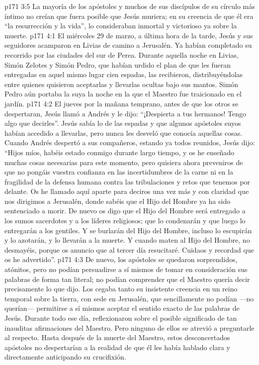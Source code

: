 \vs p171 3:5 La mayoría de los apóstoles y muchos de sus discípulos de su círculo más íntimo no creían que fuera posible que Jesús muriera; en su creencia de que él era “la resurrección y la vida”, lo consideraban inmortal y victorioso ya sobre la muerte.
\vs p171 4:1 El miércoles 29 de marzo, a última hora de la tarde, Jesús y sus seguidores acamparon en Livias de camino a Jerusalén. Ya habían completado su recorrido por las ciudades del sur de Perea. Durante aquella noche en Livias, Simón Zelotes y Simón Pedro, que habían urdido el plan de que les fueran entregadas en aquel mismo lugar cien espadas, las recibieron, distribuyéndolas entre quienes quisieron aceptarlas y llevarlas ocultas bajo sus mantos. Simón Pedro aún portaba la suya la noche en la que el Maestro fue traicionado en el jardín.
\vs p171 4:2 El jueves por la mañana temprano, antes de que los otros se despertaran, Jesús llamó a Andrés y le dijo: “¡Despierta a tus hermanos! Tengo algo que decirles”. Jesús sabía lo de las espadas y que algunos apóstoles suyos habían accedido a llevarlas, pero nunca les desveló que conocía aquellas cosas. Cuando Andrés despertó a sus compañeros, estando ya todos reunidos, Jesús dijo: “Hijos míos, habéis estado conmigo durante largo tiempo, y os he enseñado muchas cosas necesarias para este momento, pero quisiera ahora preveniros de que no pongáis vuestra confianza en las incertidumbres de la carne ni en la fragilidad de la defensa humana contra las tribulaciones y retos que tenemos por delante. Os he llamado aquí aparte para deciros una vez más y con claridad que nos dirigimos a Jerusalén, donde sabéis que el Hijo del Hombre ya ha sido sentenciado a morir. De nuevo os digo que el Hijo del Hombre será entregado a los sumos sacerdotes y a los líderes religiosos; que lo condenarán y que luego lo entregarán a los gentiles. Y se burlarán del Hijo del Hombre, incluso lo escupirán y lo azotarán, y lo llevarán a la muerte. Y cuando maten al Hijo del Hombre, no desmayéis, porque os anuncio que al tercer día resucitaré. Cuidaos y recordad que os he advertido”.
\vs p171 4:3 De nuevo, los apóstoles se quedaron sorprendidos, atónitos, pero no podían persuadirse a sí mismos de tomar en consideración sus palabras de forma tan literal; no podían comprender que el Maestro quería decir precisamente lo que dijo. Los cegaba tanto su insistente creencia en un reino temporal sobre la tierra, con sede en Jerusalén, que sencillamente no podían ---no querían--- permitirse a sí mismos aceptar el sentido exacto de las palabras de Jesús. Durante todo ese día, reflexionaron sobre el posible significado de tan inauditas afirmaciones del Maestro. Pero ninguno de ellos se atrevió a preguntarle al respecto. Hasta después de la muerte del Maestro, estos desconcertados apóstoles no despertarían a la realidad de que él les había hablado clara y directamente anticipando su crucifixión.
